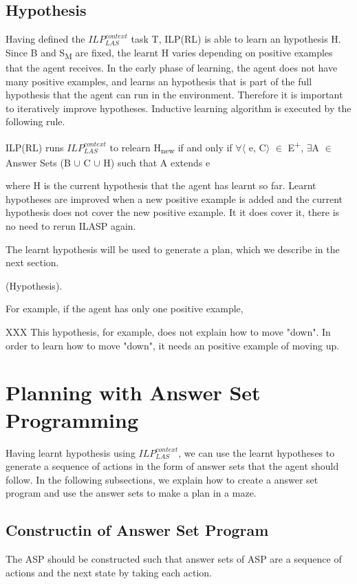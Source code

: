 \subsection{Hypothesis}
\label{sebsec:hypothesis}
Having defined the $ILP_{LAS}^{context}$ task T, ILP(RL) is able to learn an hypothesis H. 
Since B and S\textsubscript{M} are fixed, the learnt H varies depending on positive examples that the agent receives.
In the early phase of learning, the agent does not have many positive examples, and learns an hypothesis that is part of the full hypothesis that the agent can run in the environment.
Therefore it is important to iteratively improve hypotheses. Inductive learning algorithm is executed by the following rule.
\begin{defn}
ILP(RL) runs $ILP_{LAS}^{context}$ to relearn H\textsubscript{new} if and only if $\forall$$\langle$ e, C$\rangle$ $\in$ E\textsuperscript{+}, $\exists$A $\in$ Answer Sets (B $\cup$ C $\cup$ H) such that A extends e
\end{defn}
where H is the current hypothesis that the agent has learnt so far. 
Learnt hypotheses are improved when a new positive example is added and the current hypothesis does not cover the new positive example.
It it does cover it, there is no need to rerun ILASP again.

The learnt hypothesis will be used to generate a plan, which we describe in the next section.

\begin{examp} \normalfont (Hypothesis).

For example, if the agent has only one positive example,

XXX
This hypothesis, for example, does not explain how to move "down". In order to learn how to move "down", it needs an positive example of moving up.
\end{examp}

\section{Planning with Answer Set Programming}
\label{sec:planning}

Having learnt hypothesis using $ILP_{LAS}^{context}$, we can use the learnt hypotheses to generate a sequence of actions in the form of answer sets that the agent should follow.
In the following subsections, we explain how to create a answer set program and use the answer sets to make a plan in a maze.
\subsection{Constructin of Answer Set Program}
\label{subsec:construction_asp}
The ASP should be constructed such that answer sets of ASP are a sequence of actions and the next state by taking each action.


